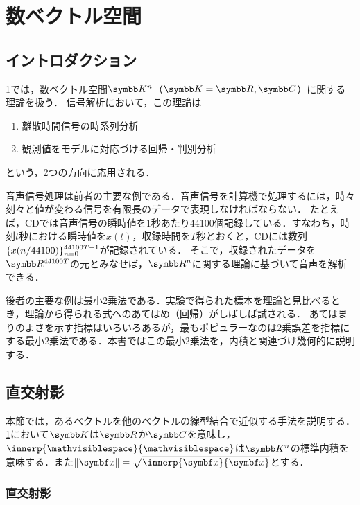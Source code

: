 \documentclass[../../main]{subfiles}
\begin{document}
\chapter{数ベクトル空間}
\label{chapter:numerical_vector_space}

\section{イントロダクション}
\label{section:numerical_vector_space_introduction}

\cref{chapter:numerical_vector_space}では，数ベクトル空間\(\numset{K}^n\)（\(\numset{K}=\numset{R},\numset{C}\)）に関する理論を扱う．
信号解析において，この理論は
\begin{enumerate}
  \item 離散時間信号の時系列分析
  \item 観測値をモデルに対応づける回帰・判別分析
\end{enumerate}
という，2つの方向に応用される．

音声信号処理は前者の主要な例である．音声信号を計算機で処理するには，時々刻々と値が変わる信号を有限長のデータで表現しなければならない．
たとえば，CDでは音声信号の瞬時値を1秒あたり44100個記録している．すなわち，時刻\(t\)秒における瞬時値を\(x(t)\)，収録時間を\(T\)秒とおくと，CDには数列\(\lbrace x(n/44100)\rbrace_{n=0}^{44100T-1}\)が記録されている．
そこで，収録されたデータを\(\numset{R}^{44100T}\)の元とみなせば，\(\numset{R}^n\)に関する理論に基づいて音声を解析できる．

後者の主要な例は最小2乗法である．実験で得られた標本を理論と見比べるとき，理論から得られる式へのあてはめ（回帰）がしばしば試される．
あてはまりのよさを示す指標はいろいろあるが，最もポピュラーなのは2乗誤差を指標にする最小2乗法である．本書ではこの最小2乗法を，内積と関連づけ幾何的に説明する．

\pagebreak

\section{直交射影}

本節では，あるベクトルを他のベクトルの線型結合で近似する手法を説明する．\cref{chapter:numerical_vector_space}において\(\numset{K}\)は\(\numset{R}\)か\(\numset{C}\)を意味し，
\(\innerp{\holder}{\holder}\)は\(\numset{K}^n\)の標準内積を意味する．また\(\vnorm{\vect{x}}=\sqrt{\innerp{\vect{x}}{\vect{x}}}\)とする\indexsymbol{\(\vnorm{\holder}\)}．

\subsection{直交射影}
\end{document}
